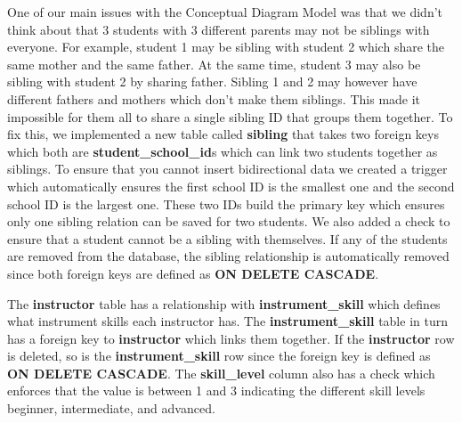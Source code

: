 \documentclass[a4paper]{scrartcl}
\begin{document}
One of our main issues with the Conceptual Diagram Model was that we didn't think about that 3 students with 3 different parents may not be siblings with everyone. For example, student 1 may be sibling with student 2 which share the same mother and the same father. At the same time, student 3 may also be sibling with student 2 by sharing father. Sibling 1 and 2 may however have different fathers and mothers which don't make them siblings. This made it impossible for them all to share a single sibling ID that groups them together. To fix this, we implemented a new table called \textbf{sibling} that takes two foreign keys which both are \textbf{student\_school\_id}s which can link two students together as siblings. To ensure that you cannot insert bidirectional data we created a trigger which automatically ensures the first school ID is the smallest one and the second school ID is the largest one. These two IDs build the primary key which ensures only one sibling relation can be saved for two students. We also added a check to ensure that a student cannot be a sibling with themselves. If any of the students are removed from the database, the sibling relationship is automatically removed since both foreign keys are defined as \textbf{ON DELETE CASCADE}.

The \textbf{instructor} table has a relationship with \textbf{instrument\_skill} which defines what instrument skills each instructor has. The \textbf{instrument\_skill} table in turn has a foreign key to \textbf{instructor} which links them together. If the \textbf{instructor} row is deleted, so is the \textbf{instrument\_skill} row since the foreign key is defined as \textbf{ON DELETE CASCADE}. The \textbf{skill\_level} column also has a check which enforces that the value is between 1 and 3 indicating the different skill levels beginner, intermediate, and advanced.
\end{document}
